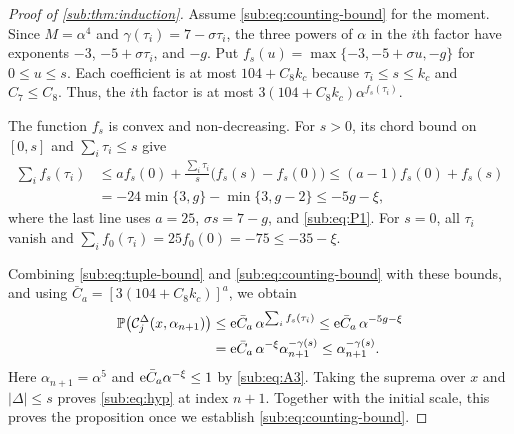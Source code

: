 \documentclass[11pt,letterpaper]{article}
\newcommand{\cC}{\mathcal C}
\begin{document}
\begin{proof}[Proof of \cref{sub:thm:induction}]
Assume \eqref{sub:eq:counting-bound} for the moment. Since $M=\alpha^4$ and $\gamma(\tau_i)=7-\sigma\tau_i$, the three powers of $\alpha$ in the $i$th factor have exponents $-3$, $-5+\sigma\tau_i$, and $-g$. Put $f_s(u)=\max\{-3,-5+\sigma u,-g\}$ for $0\le u\le s$. Each coefficient is at most $104+C_8k_c$ because $\tau_i\le s\le k_c$ and $C_7\le C_8$. Thus, the $i$th factor is at most $3(104+C_8k_c)\alpha^{f_s(\tau_i)}$.

The function $f_s$ is convex and non-decreasing. For $s>0$, its chord bound on $[0,s]$ and $\sum_i\tau_i\le s$ give
\begin{align*}
 \sum_i f_s(\tau_i)
 &\le a f_s(0)+\frac{\sum_i\tau_i}{s}\bigl(f_s(s)-f_s(0)\bigr)
 \le (a-1)f_s(0)+f_s(s)\\
 &=-24\min\{3,g\}-\min\{3,g-2\}\le-5g-\xi,
\end{align*}
where the last line uses $a=25$, $\sigma s=7-g$, and \eqref{sub:eq:P1}. For $s=0$, all $\tau_i$ vanish and $\sum_i f_0(\tau_i)=25f_0(0)=-75\le-35-\xi$.

Combining \eqref{sub:eq:tuple-bound} and \eqref{sub:eq:counting-bound} with these bounds, and using $\bar C_a=[3(104+C_8k_c)]^a$, we obtain
\begin{align*}
 \P\bigl(\cC_j^\Delta(x,\alpha_{n+1})\bigr)
 &\le \e \bar C_a\,\alpha^{\sum_i f_s(\tau_i)}
 \le \e \bar C_a\,\alpha^{-5g-\xi}\\
 &=\e \bar C_a\,\alpha^{-\xi}\alpha_{n+1}^{-\gamma(s)}
 \le \alpha_{n+1}^{-\gamma(s)}.
\end{align*}
Here $\alpha_{n+1}=\alpha^5$ and $\mathrm{e} \bar C_a\alpha^{-\xi}\le1$ by \eqref{sub:eq:A3}. Taking the suprema over $x$ and $\lvert\Delta\rvert\le s$ proves \eqref{sub:eq:hyp} at index $n+1$. Together with the initial scale, this proves the proposition once we establish \eqref{sub:eq:counting-bound}.


\end{proof}
\end{document}
